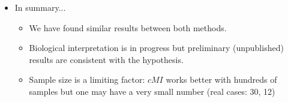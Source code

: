 \begin {itemize}
\item In summary...
  \begin{itemize}
  \item We have found similar results between both methods.
  \item Biological interpretation is in progress but preliminary (unpublished) results are consistent with the hypothesis.
  \item Sample size is a limiting factor: $cMI$ works better with hundreds of samples but one may have a very small number (real cases: 30, 12)
\end{itemize}


\end{itemize}


